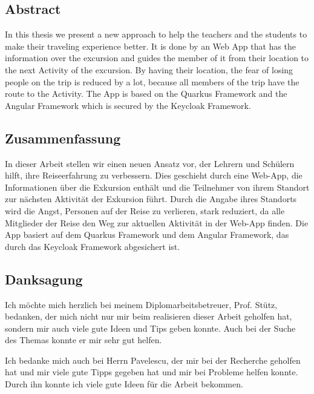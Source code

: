 \begin{spacing}{1}
    \chapter*{Abstract}
\end{spacing}
In this thesis we present a new approach to help the teachers and the students to make their traveling experience better. It is done by an Web App that has the information over the excursion and guides the member of it from their location to the next Activity of the excursion. By having their location, the fear of losing people on the trip is reduced by a lot, because all members of the trip have the route to the Activity. The App is based on the Quarkus Framework and the Angular Framework which is secured by the Keycloak Framework.  


\newpage
\begin{spacing}{1}
    \chapter*{Zusammenfassung}
\end{spacing}
In dieser Arbeit stellen wir einen neuen Ansatz vor, der Lehrern und Schülern hilft, ihre Reiseerfahrung zu verbessern. Dies geschieht durch eine Web-App, die Informationen über die Exkursion enthält und die Teilnehmer von ihrem Standort zur nächsten Aktivität der Exkursion führt. Durch die Angabe ihres Standorts wird die Angst, Personen auf der Reise zu verlieren, stark reduziert, da alle Mitglieder der Reise den Weg zur aktuellen Aktivität in der Web-App finden. Die App basiert auf dem Quarkus Framework und dem Angular Framework, das durch das Keycloak Framework abgesichert ist.

\newpage
\begin{spacing}{1}
    \chapter*{Danksagung}
\end{spacing}
Ich möchte mich herzlich bei meinem Diplomarbeitsbetreuer, Prof. Stütz, bedanken, der mich nicht nur mir beim realisieren dieser Arbeit geholfen hat, sondern mir auch viele gute Ideen und Tips geben konnte. Auch bei der Suche des Themas konnte er mir sehr gut helfen.

Ich bedanke mich auch bei Herrn Pavelescu, der mir bei der Recherche geholfen hat und mir viele gute Tipps gegeben hat und mir bei Probleme helfen konnte. Durch ihn konnte ich viele gute Ideen für die Arbeit bekommen.
